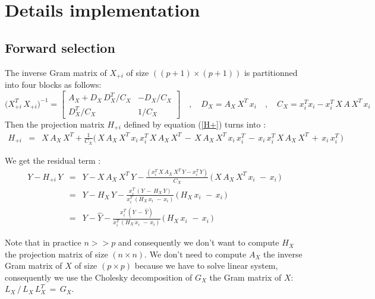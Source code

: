 \newpage
\section{Details implementation}
\subsection{Forward selection}

The inverse Gram matrix of $X_{+i}$ of size $((p+1)\times(p+1))$  is partitionned into four blocks as follows:
\begin{equation}
\big(X^T_{+i} \,X_{+i}\big)^{-1} =  
 \begin{bmatrix}
A_X + D_X\,D_X^T/C_X  & -D_X/C_X \\
D_X^T/C_X & 1/C_X
\end{bmatrix}
 \quad,\quad D_X = A_X\, X^T\,x_i 
 \quad,\quad C_X = x_i^T x_i -x_i^T \,X\,A \, X^T\, x_i
 \end{equation}
Then the projection matrix $H_{+i}$ defined by equation (\ref{H+}) turns into :
 \begin{eqnarray}
H_{+i} & = &X\,A_X \, X^T + \frac{1}{C_X} \big(\,X\,A_X \, X^T\,x_i\,x_i^T\,X\,A_X \, X^T \,-\,X\,A_X \, X^T\,x_i\,x_i^T \,-\,x_i\,x_i^T \, X\,A_X \, X^T\,+\,x_i\,x_i^T \,\big)
\end{eqnarray}

We get the residual term : 
 \begin{eqnarray}
Y-H_{+i}\,Y  & = & Y-X\,A_X \, X^T\,Y -\frac{(x_i^T\,X\,A_X \, X^T\,Y-x_i^T\,Y)}{C_X}\, \big(\,X\,A_X \, X^T\,x_i\, \,-\,x_i\,\big)\\
 & = & Y - H_X\,Y -\frac{x_i^T\,(Y\,-\,H_X\,Y)}{x_i^T\,(H_X\,x_i\, \,-\,x_i)}\, \big(\,H_X\,x_i\, \,-\,x_i\,\big)\\
\label{defH+Y}
 & = & Y - \hat{Y} -\frac{x_i^T\,(Y\,-\,\hat{Y})}{x_i^T\,(H_X\,x_i\, \,-\,x_i)}\, \big(\,H_X\,x_i\, \,-\,x_i\,\big)
\end{eqnarray}

Note that in practice $n >> p$ and consequently we don't want to compute $H_X$ the projection matrix of size $(n\times n)$. 
We don't need to compute $A_X$ the inverse Gram matrix of $X$ of size $(p\times p)$ because we have to solve linear system, consequently   
we use the Cholesky decomposition of $G_X$ the Gram matrix of $X$: $L_X  \,/\, L_X\,L_X^T\,=\,G_X$.

